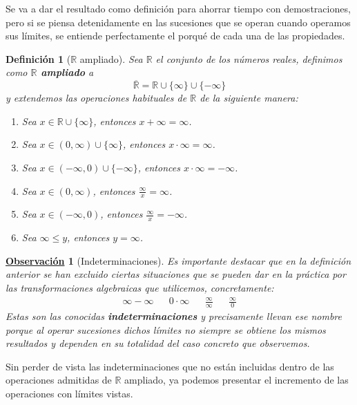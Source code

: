 \documentclass[10pt,a4paper,openright]{book}
\theoremstyle{break}
\newtheorem{defi}{Definición}[chapter]
\newtheorem{obs}{\underline{Observación}}[chapter]
\begin{document}
Se va a dar el resultado como definición para ahorrar tiempo con demostraciones, pero si se piensa detenidamente en las sucesiones que se operan cuando operamos sus límites, se entiende perfectamente el porqué de cada una de las propiedades.

\begin{defi}[$\mathbb{R}$ ampliado]
Sea $\mathbb{R}$ el conjunto de los números reales, definimos como \textbf{$\mathbb R$ ampliado} a
\[
\overline{\mathbb R}=\mathbb R\cup \{\infty\}\cup \{-\infty\}
\]
y extendemos las operaciones habituales de $\mathbb{R}$ de la siguiente manera:
\begin{enumerate}
\item Sea $x\in \mathbb R\cup \{\infty\}$, entonces $x+\infty = \infty$.
\item Sea $x\in (0,\infty)\cup\{\infty\}$, entonces $x\cdot \infty = \infty$.
\item Sea $x\in (-\infty, 0)\cup\{-\infty\}$, entonces $x\cdot \infty = -\infty $.
\item Sea $x\in (0,\infty)$, entonces $\frac{\infty}{x} = \infty$.
\item Sea $x\in (-\infty, 0)$, entonces $\frac{\infty}{x} = -\infty$.
\item Sea $\infty \leq y$, entonces $y=\infty$.
\end{enumerate}
\end{defi}

\begin{obs}[Indeterminaciones]
Es importante destacar que en la definición anterior se han excluido ciertas situaciones que se pueden dar en la práctica por las transformaciones algebraicas que utilicemos, concretamente:
\begin{align*}
\boxed{\infty -\infty} & & \boxed{0\cdot \infty} & & \boxed{\frac{\infty}{\infty}} & & \boxed{\frac{\infty}{0}}
\end{align*}
Estas son las conocidas \textbf{indeterminaciones} y precisamente llevan ese nombre porque al operar sucesiones dichos límites no siempre se obtiene los mismos resultados y dependen en su totalidad del caso concreto que observemos.
\end{obs}

Sin perder de vista las indeterminaciones que no están incluidas dentro de las operaciones admitidas de $\mathbb R$ ampliado, ya podemos presentar el incremento de las operaciones con límites vistas.
\end{document}
